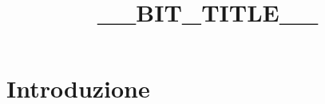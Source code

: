 \documentclass[11pt,a4paper]{article}
\title{__BIT_TITLE__}
\author{}
\date{}
\begin{document}
\maketitle

\section*{Introduzione}

\end{document}
